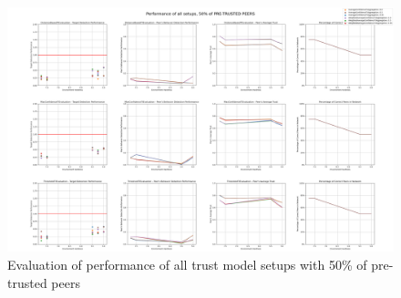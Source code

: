 \begin{figure}
    \centering
    \includegraphics[width=0.9\paperwidth, angle=90]{assets/50_all_metrics.png}
    \caption{Evaluation of performance of all trust model setups with 50\% of pre-trusted peers}
    \label{fig:performance-all-setups-50-pretrusted}
\end{figure}